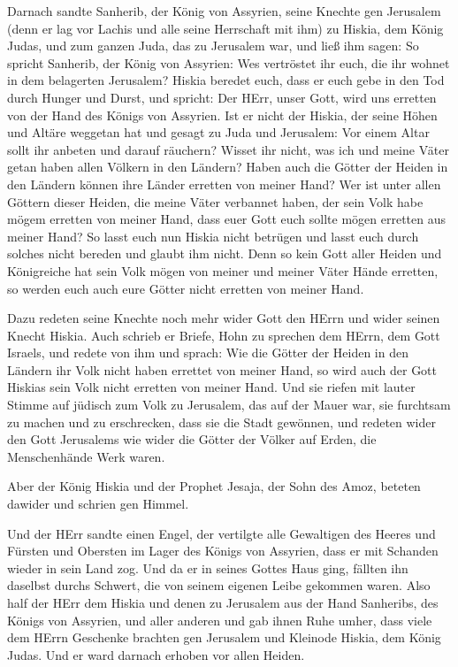  Darnach sandte Sanherib, der König von Assyrien, seine
Knechte gen Jerusalem (denn er lag vor Lachis und alle seine Herrschaft
mit ihm) zu Hiskia, dem König Judas, und zum ganzen Juda, das zu
Jerusalem war, und ließ ihm sagen:  So spricht Sanherib,
der König von Assyrien: Wes vertröstet ihr euch, die ihr wohnet in dem
belagerten Jerusalem?  Hiskia beredet euch, dass er euch
gebe in den Tod durch Hunger und Durst, und spricht: Der HErr, unser
Gott, wird uns erretten von der Hand des Königs von Assyrien.
 Ist er nicht der Hiskia, der seine Höhen und Altäre
weggetan hat und gesagt zu Juda und Jerusalem: Vor einem Altar sollt ihr
anbeten und darauf räuchern?  Wisset ihr nicht, was ich und
meine Väter getan haben allen Völkern in den Ländern? Haben auch die
Götter der Heiden in den Ländern können ihre Länder erretten von meiner
Hand?  Wer ist unter allen Göttern dieser Heiden, die meine
Väter verbannet haben, der sein Volk habe mögem erretten von meiner
Hand, dass euer Gott euch sollte mögen erretten aus meiner Hand?
 So lasst euch nun Hiskia nicht betrügen und lasst euch
durch solches nicht bereden und glaubt ihm nicht. Denn so kein Gott
aller Heiden und Königreiche hat sein Volk mögen von meiner und meiner
Väter Hände erretten, so werden euch auch eure Götter nicht erretten von
meiner Hand.

 Dazu redeten seine Knechte noch mehr wider Gott den HErrn
und wider seinen Knecht Hiskia.  Auch schrieb er Briefe,
Hohn zu sprechen dem HErrn, dem Gott Israels, und redete von ihm und
sprach: Wie die Götter der Heiden in den Ländern ihr Volk nicht haben
errettet von meiner Hand, so wird auch der Gott Hiskias sein Volk nicht
erretten von meiner Hand.  Und sie riefen mit lauter Stimme
auf jüdisch zum Volk zu Jerusalem, das auf der Mauer war, sie furchtsam
zu machen und zu erschrecken, dass sie die Stadt gewönnen, 
und redeten wider den Gott Jerusalems wie wider die Götter der Völker
auf Erden, die Menschenhände Werk waren.

 Aber der König Hiskia und der Prophet Jesaja, der Sohn des
Amoz, beteten dawider und schrien gen Himmel.

 Und der HErr sandte einen Engel, der vertilgte alle
Gewaltigen des Heeres und Fürsten und Obersten im Lager des Königs von
Assyrien, dass er mit Schanden wieder in sein Land zog. Und da er in
seines Gottes Haus ging, fällten ihn daselbst durchs Schwert, die von
seinem eigenen Leibe gekommen waren.  Also half der HErr
dem Hiskia und denen zu Jerusalem aus der Hand Sanheribs, des Königs von
Assyrien, und aller anderen und gab ihnen Ruhe umher,  dass
viele dem HErrn Geschenke brachten gen Jerusalem und Kleinode Hiskia,
dem König Judas. Und er ward darnach erhoben vor allen Heiden.

